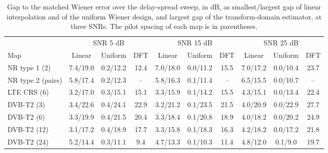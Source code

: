 \begin{table}[t]
\centering
\caption{Gap to the matched Wiener error over the delay-spread sweep, in dB, as smallest/largest gap of linear interpolation and of the uniform Wiener design, and largest gap of the transform-domain estimator, at three SNRs. The pilot spacing of each map is in parentheses.}
\label{tab:gaps}
\footnotesize
\setlength{\tabcolsep}{3.5pt}
\begin{tabular}{l ccc ccc ccc}
\toprule
 & \multicolumn{3}{c}{SNR 5 dB} & \multicolumn{3}{c}{SNR 15 dB} & \multicolumn{3}{c}{SNR 25 dB} \\
\cmidrule(lr){2-4}\cmidrule(lr){5-7}\cmidrule(lr){8-10}
Map & Linear & Uniform & DFT & Linear & Uniform & DFT & Linear & Uniform & DFT \\
\midrule
NR type 1 (2) & 7.4/19.0 & 0.2/12.2 & 12.4 & 7.0/18.0 & 0.0/11.2 & 15.5 & 7.0/17.2 & 0.0/10.4 & 23.7 \\
NR type 2 (pairs) & 5.8/17.4 & 0.2/12.3 & -- & 5.8/16.3 & 0.1/11.4 & -- & 6.5/15.5 & 0.0/10.7 & -- \\
LTE CRS (6) & 3.2/17.0 & 0.3/15.1 & 15.1 & 3.3/15.9 & 0.1/14.2 & 15.5 & 4.3/15.1 & 0.0/13.4 & 22.4 \\
DVB-T2 (3) & 3.4/22.6 & 0.4/24.1 & 22.9 & 3.2/21.2 & 0.1/23.5 & 21.5 & 4.0/20.9 & 0.0/22.9 & 27.7 \\
DVB-T2 (6) & 3.3/19.9 & 0.4/21.5 & 20.4 & 3.3/18.4 & 0.1/20.8 & 18.9 & 4.0/18.2 & 0.0/20.2 & 24.9 \\
DVB-T2 (12) & 3.1/17.2 & 0.4/18.9 & 17.7 & 3.3/15.8 & 0.1/18.3 & 16.3 & 4.2/18.2 & 0.0/17.2 & 21.8 \\
DVB-T2 (24) & 5.2/14.4 & 0.3/11.1 & 9.4 & 4.7/13.3 & 0.1/10.3 & 11.4 & 4.8/12.0 & 0.1/9.0 & 19.7 \\
\bottomrule
\end{tabular}
\end{table}
